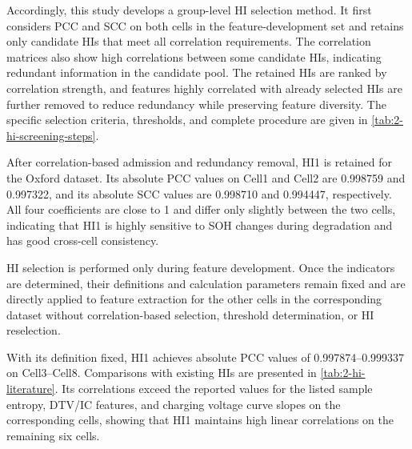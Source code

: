 

Accordingly, this study develops a group-level HI selection method. It first considers PCC and SCC on both cells in the feature-development set and retains only candidate HIs that meet all correlation requirements. The correlation matrices also show high correlations between some candidate HIs, indicating redundant information in the candidate pool. The retained HIs are ranked by correlation strength, and features highly correlated with already selected HIs are further removed to reduce redundancy while preserving feature diversity. The specific selection criteria, thresholds, and complete procedure are given in \cref{tab:2-hi-screening-steps}.


After correlation-based admission and redundancy removal, HI1 is retained for the Oxford dataset. Its absolute PCC values on Cell1 and Cell2 are 0.998759 and 0.997322, and its absolute SCC values are 0.998710 and 0.994447, respectively. All four coefficients are close to 1 and differ only slightly between the two cells, indicating that HI1 is highly sensitive to SOH changes during degradation and has good cross-cell consistency.

HI selection is performed only during feature development. Once the indicators are determined, their definitions and calculation parameters remain fixed and are directly applied to feature extraction for the other cells in the corresponding dataset without correlation-based selection, threshold determination, or HI reselection.

With its definition fixed, HI1 achieves absolute PCC values of 0.997874--0.999337 on Cell3--Cell8. Comparisons with existing HIs are presented in \cref{tab:2-hi-literature}. Its correlations exceed the reported values for the listed sample entropy, DTV/IC features, and charging voltage curve slopes on the corresponding cells, showing that HI1 maintains high linear correlations on the remaining six cells.



\FloatBarrier
